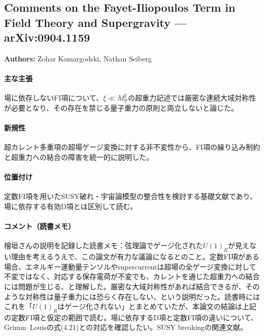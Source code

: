 \subsection{Comments on the Fayet-Iliopoulos Term in Field Theory and Supergravity --- arXiv:0904.1159}

\textbf{Authors:} Zohar Komargodski, Nathan Seiberg

\paragraph{主な主張}
場に依存しないFI項について、$\xi\ll M_{\mathrm P}^{2}$の超重力記述では厳密な連続大域対称性が必要となり、その存在を禁じる量子重力の原則と両立しないと論じた\cite{Komargodski:2009pc}。

\paragraph{新規性}
超カレント多重項の超場ゲージ変換に対する非不変性から、FI項の繰り込み制約と超重力への結合の障害を統一的に説明した。

\paragraph{位置付け}
定数FI項を用いたSUSY破れ・宇宙論模型の整合性を検討する基礎文献であり、場に依存する有効D項とは区別して読む。

\paragraph{コメント（読書メモ）}
檜垣さんの説明を記録した読書メモ：弦理論でゲージ化された$U(1)_R$が見えない理由を考えるうえで、この論文が有力な議論になるとのこと。定数FI項がある場合、エネルギー運動量テンソルやsupercurrentは超場の全ゲージ変換に対して不変ではなく、対応する保存電荷が不変でも、カレントを通じた超重力への結合には問題が生じる、と理解した。厳密な大域対称性があれば結合できるが、そのような対称性は量子重力には恐らく存在しない、という説明だった。読書時にはこれを「$U(1)_R$はゲージ化されない」とまとめていたが、本論文の結論は上記の定数FI項と仮定の範囲で読む。場に依存するD項と定数FI項の違いについて、Grimm--Louisの式(4.21)\cite{Grimm:2004uq}との対応を確認したい。SUSY breakingの関連文献。
